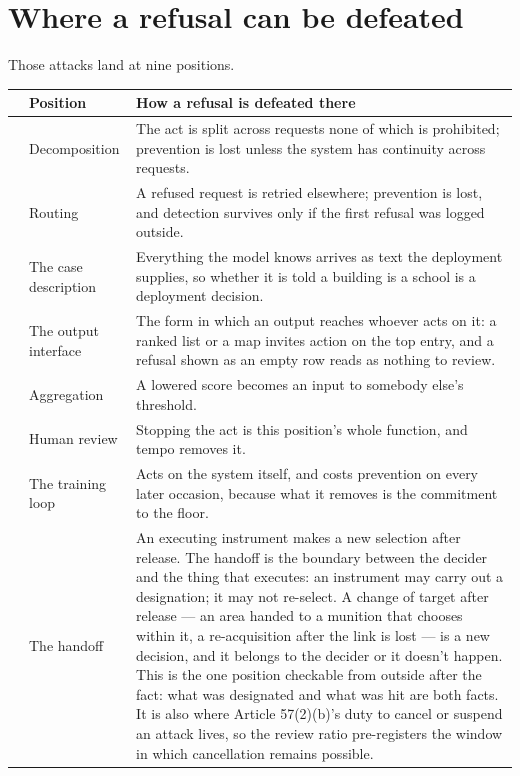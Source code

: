 \section{Where a refusal can be defeated}
\label{sec:4.3}
Those attacks land at nine positions.

\begingroup\small\renewcommand{\arraystretch}{1.12}
\begin{longtable}{@{}>{\raggedright\arraybackslash}p{}>{\raggedright\arraybackslash}p{}>{\raggedright\arraybackslash}p{}@{}}
\hline
 & \textbf{Position} & \textbf{How a refusal is defeated there} \\
\hline
\endhead
1 & Decomposition & The act is split across requests none of which is prohibited; prevention is lost unless the system has continuity across requests. \\ \hline
2 & Routing & A refused request is retried elsewhere; prevention is lost, and detection survives only if the first refusal was logged outside. \\ \hline
3 & The case description & Everything the model knows arrives as text the deployment supplies, so whether it is told a building is a school is a deployment decision. \\ \hline
4 & The output interface & The form in which an output reaches whoever acts on it: a ranked list or a map invites action on the top entry, and a refusal shown as an empty row reads as nothing to review. \\ \hline
5 & Aggregation & A lowered score becomes an input to somebody else's threshold. \\ \hline
6 & Human review & Stopping the act is this position's whole function, and tempo removes it. \\ \hline
7 & The training loop & Acts on the system itself, and costs prevention on every later occasion, because what it removes is the commitment to the floor. \\ \hline
8 & The handoff & An executing instrument makes a new selection after release. The handoff is the boundary between the decider and the thing that executes: an instrument may carry out a designation; it may not re-select. A change of target after release — an area handed to a munition that chooses within it, a re-acquisition after the link is lost — is a new decision, and it belongs to the decider or it doesn't happen. This is the one position checkable from outside after the fact: what was designated and what was hit are both facts. It is also where Article 57(2)(b)'s duty to cancel or suspend an attack lives, so the review ratio pre-registers the window in which cancellation remains possible. \\ \hline

\end{longtable}
